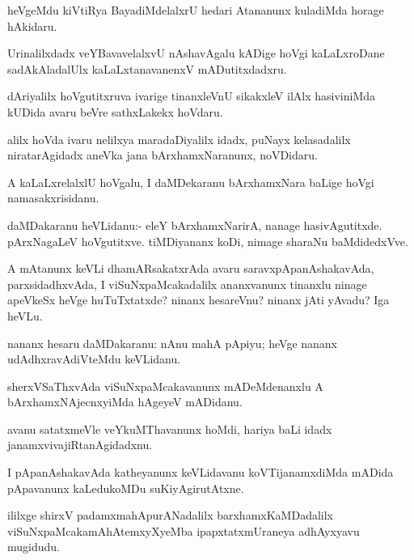 \begin{mng}
heVgeMdu kiVtiRya BayadiMdelalxrU hedari Atananunx kuladiMda horage hAkidaru.
\end{mng}

\begin{mng}
Urinalilxdadx veYBavavelalxvU nAshavAgalu kADige hoVgi kaLaLxroDane sadAkAladalUlx kaLaLxtanavanenxV mADutitxdadxru.
\end{mng}

\begin{mng}
dAriyalilx hoVgutitxruva ivarige tinanxleVnU sikakxleV ilAlx hasiviniMda kUDida avaru beVre sathxLakekx hoVdaru.
\end{mng}

\begin{mng}
alilx hoVda ivaru nelilxya maradaDiyalilx idadx, puNayx kelasadalilx niratarAgidadx aneVka jana bArxhamxNaranunx, noVDidaru.
\end{mng}

\begin{mng}
A kaLaLxrelalxlU hoVgalu, I daMDekaranu bArxhamxNara baLige hoVgi namasakxrisidanu.
\end{mng}

\begin{mng}
daMDakaranu heVLidanu:- eleY bArxhamxNarirA, nanage hasivAgutitxde. pArxNagaLeV hoVgutitxve. tiMDiyananx koDi, nimage sharaNu baMdidedxVve.
\end{mng}

\begin{mng}
A mAtanunx keVLi dhamARsakatxrAda avaru saravxpApanAshakavAda, parxsidadhxvAda, I viSuNxpaMcakadalilx ananxvanunx tinanxlu ninage apeVkeSx heVge huTuTxtatxde? ninanx hesareVnu? ninanx jAti yAvadu? Iga heVLu.
\end{mng}

\begin{mng}
nananx hesaru daMDakaranu: nAnu mahA pApiyu; heVge nananx udAdhxravAdiVteMdu keVLidanu.
\end{mng}

\begin{mng}
sherxVSaThxvAda viSuNxpaMcakavanunx mADeMdenanxlu A bArxhamxNAjecnxyiMda hAgeyeV mADidanu.
\end{mng}

\begin{mng}
avanu satatxmeVle veYkuMThavanunx hoMdi, hariya baLi idadx janamxvivajiRtanAgidadxnu.
\end{mng}

\begin{mng}
I pApanAshakavAda katheyanunx keVLidavanu koVTijanamxdiMda mADida pApavanunx kaLedukoMDu suKiyAgirutAtxne.
\end{mng}
ililxge shirxV padamxmahApurANadalilx barxhamxKaMDadalilx viSuNxpaMcakamAhAtemxyXyeMba ipapxtatxmUraneya adhAyxyavu mugidudu.

